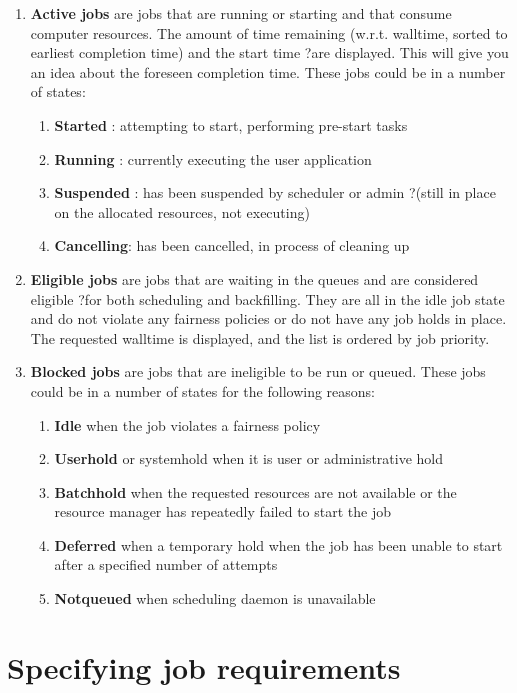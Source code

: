 \begin{enumerate}
\item  \textbf{Active jobs} are jobs that are running or starting and that consume computer resources. The amount of time remaining (w.r.t. walltime, sorted to earliest completion time) and the start time ?are displayed. This will give you an idea about the foreseen completion time. These jobs could be in a number of states:

\begin{enumerate}
\item  \textbf{Started} : attempting to start, performing pre-start tasks
\item  \textbf{Running} : currently executing the user application
\item  \textbf{Suspended} : has been suspended by scheduler or admin ?(still in place on the allocated resources, not executing)
\item  \textbf{Cancelling}: has been cancelled, in process of cleaning up
\end{enumerate}
\item  \textbf{Eligible jobs} are jobs that are waiting in the queues and are considered eligible ?for both scheduling and backfilling.  They are all in the idle job state and do not violate any fairness policies or do not have any job holds in place. The requested walltime is displayed, and the list is ordered by job priority.
\item  \textbf{Blocked jobs} are jobs that are ineligible to be run or queued.  These jobs could be in a number of states for the following reasons:

\begin{enumerate}
\item  \textbf{Idle} when the job violates a fairness policy
\item  \textbf{Userhold} or systemhold when it is user or administrative hold
\item  \textbf{Batchhold} when the requested resources are not available or the resource manager has repeatedly failed to start the job
\item  \textbf{Deferred} when a temporary hold when the job has been unable to start after a specified number of attempts
\item  \textbf{Notqueued} when scheduling daemon is unavailable
\end{enumerate}
\end{enumerate}

\section{Specifying job requirements}

